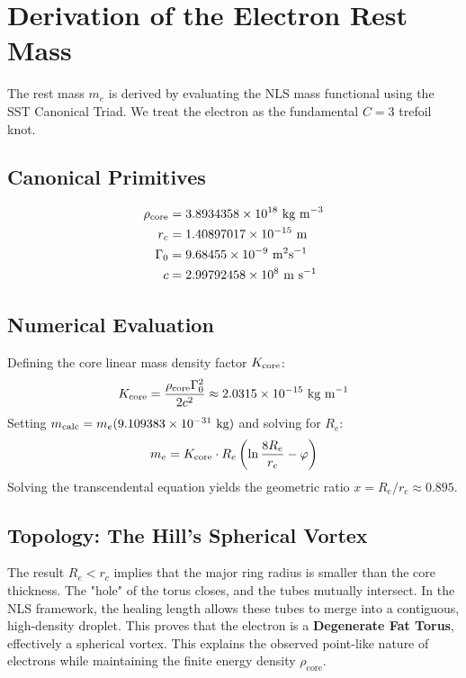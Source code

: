\documentclass[11pt]{article}
\newcommand{\rc}{r_c}                                    %
\newcommand{\rhocore}{\rho_{\text{core}}}
\begin{document}
\section{Derivation of the Electron Rest Mass}
The rest mass $m_e$ is derived by evaluating the NLS mass functional using the SST Canonical Triad. We treat the electron as the fundamental $C=3$ trefoil knot.

\subsection{Canonical Primitives}
\begin{align*}
    \rhocore &= 3.8934358 \times 10^{18} \text{ kg m}^{-3} \\
    \rc &= 1.40897017 \times 10^{-15} \text{ m} \\
    \Gammazero &= 9.68455 \times 10^{-9} \text{ m}^2 \text{s}^{-1} \\
    c &= 2.99792458 \times 10^8 \text{ m s}^{-1}
\end{align*}

\subsection{Numerical Evaluation}
Defining the core linear mass density factor $K_{\rm core}$:
\begin{equation}
    K_{\rm core} = \frac{\rhocore \Gammazero^2}{2c^2} \approx 2.0315 \times 10^{-15} \text{ kg m}^{-1}
\end{equation}
Setting $m_{\rm calc} = m_e (9.109383 \times 10^{-31} \text{ kg})$ and solving for $R_e$:
\begin{equation}
    m_e = K_{\rm core} \cdot R_e \left( \ln \frac{8R_e}{\rc} - \phiG \right)
\end{equation}
Solving the transcendental equation yields the geometric ratio $x = R_e / \rc \approx 0.895$.


\subsection{Topology: The Hill's Spherical Vortex}
The result $R_e < \rc$ implies that the major ring radius is smaller than the core thickness. The "hole" of the torus closes, and the tubes mutually intersect. In the NLS framework, the healing length allows these tubes to merge into a contiguous, high-density droplet. This proves that the electron is a \textbf{Degenerate Fat Torus}, effectively a spherical vortex. This explains the observed point-like nature of electrons while maintaining the finite energy density $\rhocore$.
\end{document}
